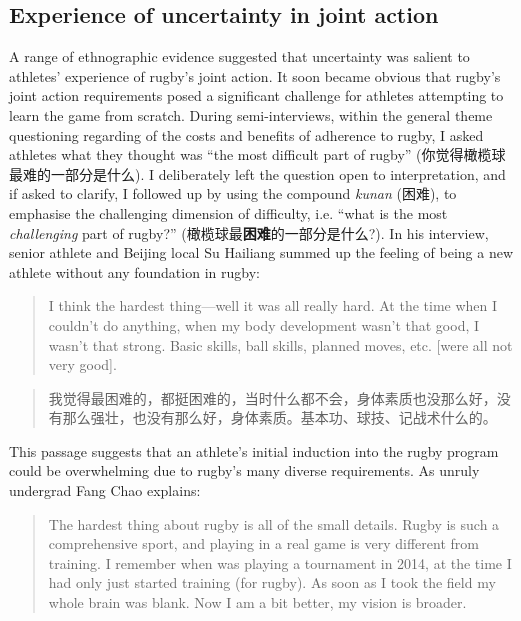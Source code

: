 \begin{CJK}{UTF8}{gbsn}
\section{Experience of uncertainty in joint action\label{sect:uncertaintyJA}}

A range of ethnographic evidence suggested that uncertainty was salient to athletes' experience of rugby's joint action.  It soon became obvious that rugby's joint action requirements posed a significant challenge for athletes attempting to learn the game from scratch.  During semi-interviews, within the general theme questioning regarding of the costs and benefits of adherence to rugby, I asked athletes what they thought was ``the most difficult part of rugby'' (你觉得橄榄球最难的一部分是什么).  I deliberately left the question open to interpretation, and if asked to clarify, I followed up by using the compound \textit{kunan} (困难), to emphasise the challenging dimension of difficulty, i.e. ``what is the most \textit{challenging} part of rugby?'' (橄榄球最\textbf{困难}的一部分是什么?).  In his interview, senior athlete and Beijing local Su Hailiang summed up the feeling of being a new athlete without any foundation in rugby:

      \begin{quote}
          I think the hardest thing---well it was all really hard.  At the time when I couldn't do anything, when my body development wasn't that good, I wasn't that strong.  Basic skills, ball skills, planned moves, etc. [were all not very good].
      \end{quote}
      \begin{quote}
          我觉得最困难的，都挺困难的，当时什么都不会，身体素质也没那么好，没有那么强壮，也没有那么好，身体素质。基本功、球技、记战术什么的。
      \end{quote}

This passage suggests that an athlete's initial induction into the rugby program could be overwhelming due to rugby's many diverse requirements.  As unruly undergrad Fang Chao explains:
                \begin{quote}
                The hardest thing about rugby is all of the small details. Rugby is such a comprehensive sport, and playing in a real game is very different from training. I remember when was playing a tournament in 2014, at the time I had only just started training (for rugby).  As soon as I took the field my whole brain was blank.  Now I am a bit better, my vision is broader.
                \end{quote}


\end{CJK}
